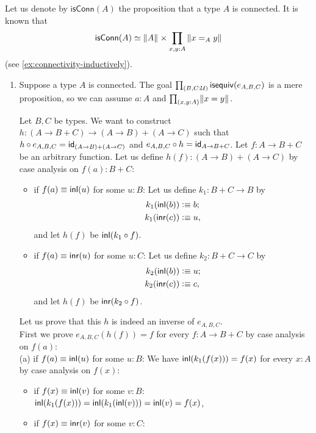 \documentclass[
%
%
11pt %
]{article}
\begin{document}
Let us denote by $\mathsf{isConn}(A)$ the proposition that a type $A$ is connected. It is known that
\begin{displaymath}
 \eqv{\mathsf{isConn}(A)}{\brck A \times \prd{x,y:A} \brck {\id[A]xy}}
\end{displaymath}
(see \cref{ex:connectivity-inductively}).
\begin{enumerate}
 \item Suppose a type $A$ is connected. The goal $\prd{B,C:\type} \isequiv(e_{A,B,C})$ is a mere proposition, so we can assume $a:A$ and $\prd{x,y:A} \brck {x = y}$.

       Let $B,C$ be types.
       We want to construct $h:(A\to B+C) \to (A\to B)+(A\to C)$ such that
       $h \circ e_{A,B,C} = \idfunc[(A \to B) + (A \to C)]$ and
       $e_{A,B,C} \circ h = \idfunc[A \to B + C]$.
       Let $f:A \to B+C$ be an arbitrary function.
       Let us define $h(f):(A \to B) + (A \to C)$
       by case analysis on $f(a):B + C$:
       \begin{itemize}
	\item if $f(a) \jdeq \inl(u)$ for some $u:B$:
	      Let us define $k_1:B+C\to B$ by
	      \begin{align*}
	       k_1(\inl(b)) &\defeq b;\\
	       k_1(\inr(c)) &\defeq u,
	      \end{align*}
	      and let $h(f)$ be $\inl(k_1 \circ f)$.
	\item if $f(a) \jdeq \inr(u)$ for some $u:C$:
	      Let us define $k_2:B+C\to C$ by
	      \begin{align*}
	       k_2(\inl(b)) &\defeq u;\\
	       k_2(\inr(c)) &\defeq c,
	      \end{align*}
	      and let $h(f)$ be $\inr(k_2 \circ f)$.
       \end{itemize}
       Let us prove that this $h$ is indeed an inverse of $e_{A,B,C}$.\\
       First we prove $e_{A,B,C}(h(f)) = f$ for every $f:A \to B + C$
       by case analysis on $f(a)$:\\
       (a) if $f(a) \jdeq \inl(u)$ for some $u:B$:
       We have $\inl(k_1(f(x))) = f(x)$ for every $x:A$
       by case analysis on $f(x)$:
       \begin{itemize}
	\item if $f(x) \jdeq \inl(v)$ for some $v:B$:
	      $\inl(k_1(f(x))) = \inl(k_1(\inl(v))) = \inl(v) = f(x)$,
	\item if $f(x) \jdeq \inr(v)$ for some $v:C$:

\end{itemize}
\end{enumerate}
\end{document}
